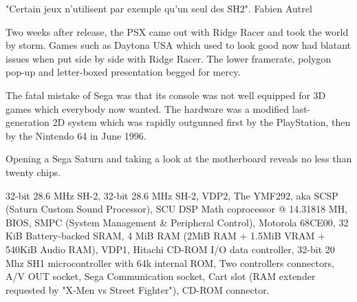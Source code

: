 "Certain jeux n'utilisent par exemple qu'un seul des SH2". Fabien Autrel

\par
 Two weeks after release, the PSX came out with Ridge Racer and took the world by storm. Games such as Daytona USA which used to look good now had blatant issues when put side by side with Ridge Racer. The lower framerate, polygon pop-up and letter-boxed presentation begged for mercy.\\
\par
The fatal mistake of Sega was that its console was not well equipped for 3D games which everybody now wanted. The hardware was a modified last-generation 2D system which was rapidly outgunned first by the PlayStation, then by the Nintendo 64 in June 1996.








\par
Opening a Sega Saturn and taking a look at the motherboard reveals no less than twenty chips.\\
\par
{} 32-bit 28.6 MHz SH-2, 
 32-bit 28.6 MHz SH-2, 
 VDP2, 
 The YMF292, aka SCSP (Saturn Custom Sound Processor), 
 SCU DSP Math coprocessor @ 14.31818 MH, 
 BIOS, 
 SMPC (System Management \& Peripheral Control), 
 Motorola 68CE00, 
 32 KiB Battery-backed SRAM, 
 4 MiB RAM (2MiB RAM + 1.5MiB VRAM + 540KiB Audio RAM), 
 VDP1, 
 Hitachi CD-ROM I/O data controller, 
 32-bit 20 Mhz SH1  microcontroller with 64k internal ROM, 
 Two controllers connectors, 
 A/V OUT socket,  
 Sega Communication socket,  
 Cart slot (RAM extender requested by "X-Men vs Street Fighter"), 
 CD-ROM connector.
\pagebreak



